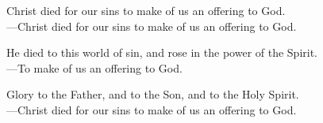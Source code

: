 \responsory

\noindent Christ died for our sins to make of us an offering to God.\\
{\color{red}---\thinspace}Christ died for our sins to make of us an offering to God.

\medskip\noindent He died to this world of sin, and rose in the power of the Spirit.\\
{\color{red}---\thinspace}To make of us an offering to God.

\medskip\noindent Glory to the Father, and to the Son, and to the Holy Spirit.\\
{\color{red}---\thinspace}Christ died for our sins to make of us an offering to God.